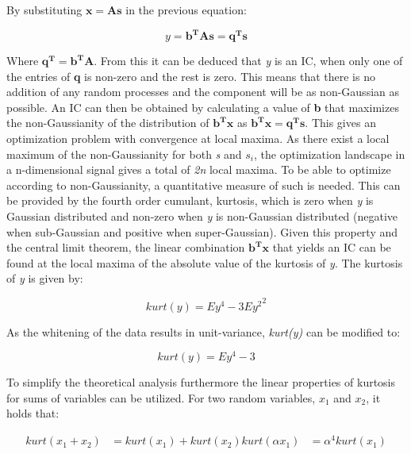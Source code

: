 By substituting $\mathbf{x} = \mathbf{A}\mathbf{s}$ in the previous equation:

\begin{equation}
y = \mathbf{b^T}\mathbf{A}\mathbf{s} = \mathbf{q^T}\mathbf{s}
\end{equation}

Where $\mathbf{q^T} = \mathbf{b^T}\mathbf{A}$. From this it can be deduced that \textit{y} is an IC, when only one of the entries of \textbf{q} is non-zero and the rest is zero. This means that there is no addition of any random processes and the component will be as non-Gaussian as possible. An IC can then be obtained by calculating a value of \textbf{b} that maximizes the non-Gaussianity of the distribution of $\mathbf{b^T}\mathbf{x}$ as $\mathbf{b^T}\mathbf{x} = \mathbf{q^T}\mathbf{s}$. This gives an optimization problem with convergence at local maxima. As there exist a local maximum of the non-Gaussianity for both \textit{s} and ${s_i}$, the optimization landscape in a n-dimensional signal gives a total of \textit{2n} local maxima.
To be able to optimize according to non-Gaussianity, a quantitative measure of such is needed. This can be provided by the fourth order cumulant, kurtosis, which is zero when \textit{y} is Gaussian distributed and non-zero when \textit{y} is non-Gaussian distributed (negative when sub-Gaussian and positive when super-Gaussian). Given this property and the central limit theorem, the linear combination $\mathbf{b^T}\mathbf{x}$ that yields an IC can be found at the local maxima of the absolute value of the kurtosis of \textit{y}. The kurtosis of \textit{y} is given by:
		
\begin{equation}
kurt(y) = E{y^4} - 3E{y^2}^2
\end{equation}
	
As the whitening of the data results in unit-variance, \textit{kurt(y)} can be modified to:
		
\begin{equation}
kurt(y) = E{y^4} - 3
\end{equation}
		
To simplify the theoretical analysis furthermore the linear properties of kurtosis for sums of variables can be utilized. For two random variables, \textit{$x_1$} and \textit{$x_2$}, it holds that:
	
\begin{align*}
kurt(x_1 + x_2) &= kurt(x_1) + kurt(x_2)
kurt(\alpha x_1) &= \alpha^4 kurt(x_1)
\end{align*}
	

